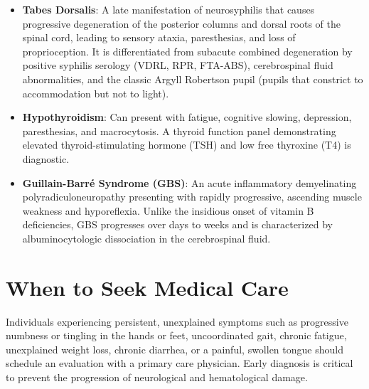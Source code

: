 \begin{itemize}
    \item \textbf{Tabes Dorsalis}: A late manifestation of neurosyphilis that causes progressive degeneration of the posterior columns and dorsal roots of the spinal cord, leading to sensory ataxia, paresthesias, and loss of proprioception. It is differentiated from subacute combined degeneration by positive syphilis serology (VDRL, RPR, FTA-ABS), cerebrospinal fluid abnormalities, and the classic Argyll Robertson pupil (pupils that constrict to accommodation but not to light).
    \item \textbf{Hypothyroidism}: Can present with fatigue, cognitive slowing, depression, paresthesias, and macrocytosis. A thyroid function panel demonstrating elevated thyroid-stimulating hormone (TSH) and low free thyroxine (T4) is diagnostic.
    \item \textbf{Guillain-Barré Syndrome (GBS)}: An acute inflammatory demyelinating polyradiculoneuropathy presenting with rapidly progressive, ascending muscle weakness and hyporeflexia. Unlike the insidious onset of vitamin B deficiencies, GBS progresses over days to weeks and is characterized by albuminocytologic dissociation in the cerebrospinal fluid.
\end{itemize}

\section*{When to Seek Medical Care}
Individuals experiencing persistent, unexplained symptoms such as progressive numbness or tingling in the hands or feet, uncoordinated gait, chronic fatigue, unexplained weight loss, chronic diarrhea, or a painful, swollen tongue should schedule an evaluation with a primary care physician. Early diagnosis is critical to prevent the progression of neurological and hematological damage.

